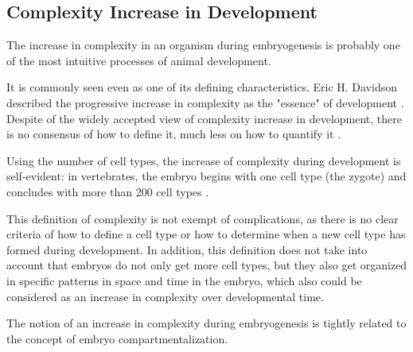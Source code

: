 \subsection{Complexity Increase in Development}

The increase in complexity in an organism during embryogenesis is probably one of the most intuitive processes of animal development.

It is commonly seen even as one of its defining characteristics.
Eric H. Davidson described the progressive increase in complexity as the "essence" of development \citep{Davidson2001}. Despite of the widely accepted view of complexity increase in development, there is no consensus of how to define it, much less on how to quantify it \citep{susan2000ontogeny}.


Using the number of cell types, the increase of complexity during development is self-evident: in vertebrates, the embryo begins with one cell type (the zygote) and concludes with more than 200 cell types \citep{Alberts1994}. 


This definition of complexity is not exempt of complications, as there is no clear criteria of how to define a cell type or how to determine when a new cell type has formed during development. 
%
In addition, this definition does not take into account that embryos do not only get more cell types, but they also get organized in specific patterns in space and time in the embryo, which also could be considered as an increase in complexity over developmental time.

The notion of an increase in complexity during embryogenesis is tightly related to the concept of embryo compartmentalization.


